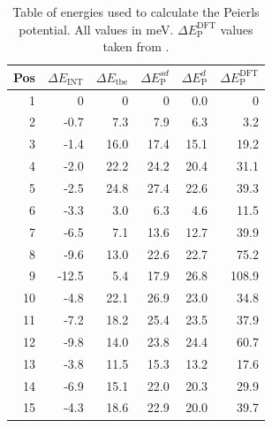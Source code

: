 \documentclass[a4paper,11pt]{article}
\begin{document}
\begin{table}[htbp]
\caption{Table of energies used to calculate the Peierls potential. All values in meV. \(\Delta E_{\text{P}}^{\text{DFT}}\) values taken from \cite{Itakura2012}. \label{tab:peierlspot}}
\centering
\begin{tabular}{rrrrrr}
Pos & \(\Delta E_{\text{INT}}\) & \(\Delta E_{\text{tbe}}\) & \(\Delta E_{\text{P}}^{sd}\) & \(\Delta E_{\text{P}}^{d}\) & \(\Delta E_{\text{P}}^{\text{DFT}}\)\\
\hline
1 & 0 & 0 & 0 & 0.0 & 0\\
2 & -0.7 & 7.3 & 7.9 & 6.3 & 3.2\\
3 & -1.4 & 16.0 & 17.4 & 15.1 & 19.2\\
4 & -2.0 & 22.2 & 24.2 & 20.4 & 31.1\\
5 & -2.5 & 24.8 & 27.4 & 22.6 & 39.3\\
6 & -3.3 & 3.0 & 6.3 & 4.6 & 11.5\\
7 & -6.5 & 7.1 & 13.6 & 12.7 & 39.9\\
8 & -9.6 & 13.0 & 22.6 & 22.7 & 75.2\\
9 & -12.5 & 5.4 & 17.9 & 26.8 & 108.9\\
10 & -4.8 & 22.1 & 26.9 & 23.0 & 34.8\\
11 & -7.2 & 18.2 & 25.4 & 23.5 & 37.9\\
12 & -9.8 & 14.0 & 23.8 & 24.4 & 60.7\\
13 & -3.8 & 11.5 & 15.3 & 13.2 & 17.6\\
14 & -6.9 & 15.1 & 22.0 & 20.3 & 29.9\\
15 & -4.3 & 18.6 & 22.9 & 20.0 & 39.7\\
\end{tabular}
\end{table}
\end{document}
